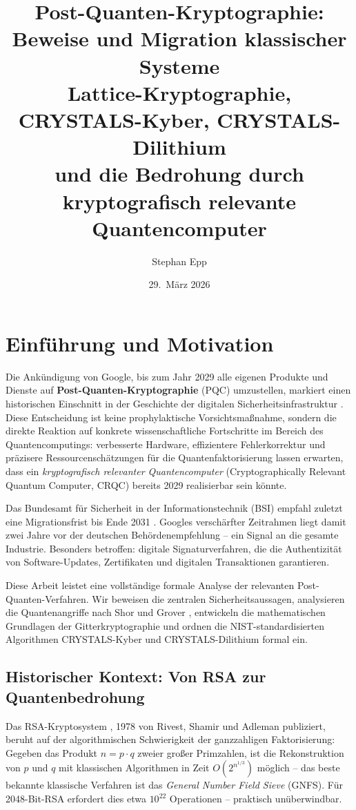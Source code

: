 ﻿\documentclass[a4paper,12pt]{article}
\title{\textbf{Post-Quanten-Kryptographie:\\
Beweise und Migration klassischer Systeme}\\[0.8ex]
\large Lattice-Kryptographie, CRYSTALS-Kyber, CRYSTALS-Dilithium\\
und die Bedrohung durch kryptografisch relevante Quantencomputer}
\author{Stephan Epp}
\date{29.\ M\"arz 2026}
\theoremstyle{definition}
\begin{document}
\maketitle
\tableofcontents
\newpage

\section{Einf\"uhrung und Motivation}

Die Ankündigung von Google, bis zum Jahr 2029 alle eigenen Produkte und Dienste auf
\textbf{Post-Quanten-Kryptographie} (PQC) umzustellen, markiert einen historischen
Einschnitt in der Geschichte der digitalen Sicherheitsinfrastruktur \cite{Goo26,Hei26}.
Diese Entscheidung ist keine prophylaktische Vorsichtsmaßnahme, sondern die direkte
Reaktion auf konkrete wissenschaftliche Fortschritte im Bereich des Quantencomputings:
verbesserte Hardware, effizientere Fehlerkorrektur und präzisere Ressourcenschätzungen
für die Quantenfaktorisierung lassen erwarten, dass ein \emph{kryptografisch relevanter
Quantencomputer} (Cryptographically Relevant Quantum Computer, CRQC) bereits 2029
realisierbar sein könnte.

Das Bundesamt für Sicherheit in der Informationstechnik (BSI) empfahl zuletzt eine
Migrationsfrist bis Ende 2031 \cite{BSI24}. Googles verschärfter Zeitrahmen liegt
damit zwei Jahre vor der deutschen Behördenempfehlung -- ein Signal an die gesamte
Industrie. Besonders betroffen: digitale Signaturverfahren, die die Authentizität
von Software-Updates, Zertifikaten und digitalen Transaktionen garantieren.

Diese Arbeit leistet eine vollständige formale Analyse der relevanten
Post-Quanten-Verfahren. Wir beweisen die zentralen Sicherheitsaussagen, analysieren
die Quantenangriffe nach Shor \cite{Sho94} und Grover \cite{Gro96}, entwickeln
die mathematischen Grundlagen der Gitterkryptographie \cite{Reg05,LPR10,MR09}
und ordnen die NIST-standardisierten Algorithmen CRYSTALS-Kyber \cite{ABD+22}
und CRYSTALS-Dilithium \cite{DKL+22} formal ein.

\subsection{Historischer Kontext: Von RSA zur Quantenbedrohung}

Das RSA-Kryptosystem \cite{Riv78}, 1978 von Rivest, Shamir und Adleman publiziert,
beruht auf der algorithmischen Schwierigkeit der ganzzahligen Faktorisierung:
Gegeben das Produkt $n = p \cdot q$ zweier großer Primzahlen, ist die Rekonstruktion
von $p$ und $q$ mit klassischen Algorithmen in Zeit $O(2^{n^{1/3}})$ möglich --
das beste bekannte klassische Verfahren ist das \emph{General Number Field Sieve}
(GNFS). Für 2048-Bit-RSA erfordert dies etwa $10^{22}$ Operationen -- praktisch
unüberwindbar.
\end{document}
